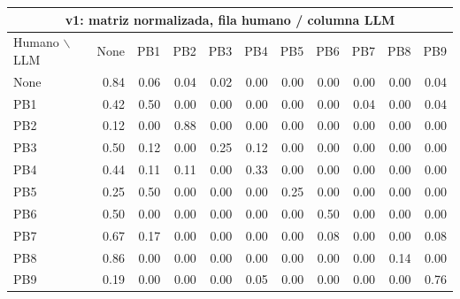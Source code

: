 \begin{center}
\tiny
\setlength{\tabcolsep}{2.4pt}
\renewcommand{\arraystretch}{1.05}
\begin{tabular}{lrrrrrrrrrr}
\toprule
\multicolumn{11}{c}{\textbf{v1: matriz normalizada, fila humano / columna LLM}} \\
\midrule
Humano $\backslash$ LLM & None & PB1 & PB2 & PB3 & PB4 & PB5 & PB6 & PB7 & PB8 & PB9 \\
\midrule
None & 0.84 & 0.06 & 0.04 & 0.02 & 0.00 & 0.00 & 0.00 & 0.00 & 0.00 & 0.04 \\
PB1  & 0.42 & 0.50 & 0.00 & 0.00 & 0.00 & 0.00 & 0.00 & 0.04 & 0.00 & 0.04 \\
PB2  & 0.12 & 0.00 & 0.88 & 0.00 & 0.00 & 0.00 & 0.00 & 0.00 & 0.00 & 0.00 \\
PB3  & 0.50 & 0.12 & 0.00 & 0.25 & 0.12 & 0.00 & 0.00 & 0.00 & 0.00 & 0.00 \\
PB4  & 0.44 & 0.11 & 0.11 & 0.00 & 0.33 & 0.00 & 0.00 & 0.00 & 0.00 & 0.00 \\
PB5  & 0.25 & 0.50 & 0.00 & 0.00 & 0.00 & 0.25 & 0.00 & 0.00 & 0.00 & 0.00 \\
PB6  & 0.50 & 0.00 & 0.00 & 0.00 & 0.00 & 0.00 & 0.50 & 0.00 & 0.00 & 0.00 \\
PB7  & 0.67 & 0.17 & 0.00 & 0.00 & 0.00 & 0.00 & 0.08 & 0.00 & 0.00 & 0.08 \\
PB8  & 0.86 & 0.00 & 0.00 & 0.00 & 0.00 & 0.00 & 0.00 & 0.00 & 0.14 & 0.00 \\
PB9  & 0.19 & 0.00 & 0.00 & 0.00 & 0.05 & 0.00 & 0.00 & 0.00 & 0.00 & 0.76 \\
\bottomrule
\end{tabular}
\end{center}

